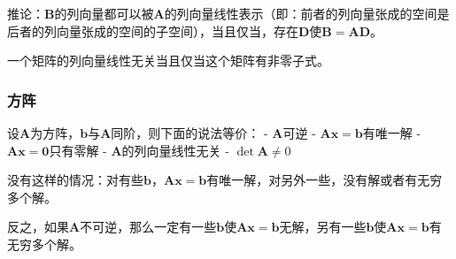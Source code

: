 推论：\(\boldsymbol{B}\)的列向量都可以被\(\boldsymbol{A}\)的列向量线性表示（即：前者的列向量张成的空间是后者的列向量张成的空间的子空间），当且仅当，存在\(\boldsymbol{D}\)使\(\boldsymbol{B} = \boldsymbol{A} \boldsymbol{D}\)。

一个矩阵的列向量线性无关当且仅当这个矩阵有非零子式。

\hypertarget{ux65b9ux9635}{%
\subsubsection{方阵}\label{ux65b9ux9635}}

设\(\boldsymbol{A}\)为方阵，\(\boldsymbol{b}\)与\(\boldsymbol{A}\)同阶，则下面的说法等价：
- \(\boldsymbol{A}\)可逆 -
\(\boldsymbol{A} \boldsymbol{x} = \boldsymbol{b}\)有唯一解 -
\(\boldsymbol{A} \boldsymbol{x} = \boldsymbol{0}\)只有零解 -
\(\boldsymbol{A}\)的列向量线性无关 - \(\det \boldsymbol{A} \neq 0\)

没有这样的情况：对有些\(\boldsymbol{b}\)，\(\boldsymbol{A} \boldsymbol{x} = \boldsymbol{b}\)有唯一解，对另外一些，没有解或者有无穷多个解。

反之，如果\(\boldsymbol{A}\)不可逆，那么一定有一些\(\boldsymbol{b}\)使\(\boldsymbol{A} \boldsymbol{x} = \boldsymbol{b}\)无解，另有一些\(\boldsymbol{b}\)使\(\boldsymbol{A} \boldsymbol{x} = \boldsymbol{b}\)有无穷多个解。
